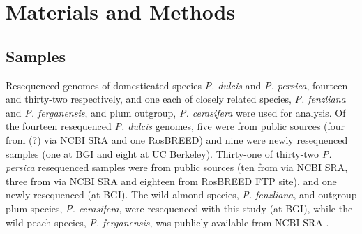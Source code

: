 \documentclass[12pt]{article}
\begin{document}
\section*{Materials and Methods}
%
\subsection*{Samples}
Resequenced genomes of domesticated species \emph{P. dulcis} and \emph{P. persica}, fourteen and thirty-two respectively, and one each of closely related species, \emph{P. fenzliana} and \emph{P. ferganensis}, and plum outgroup, \emph{P. cerasifera} were used for analysis.
%
Of the fourteen resequenced \emph{P. dulcis} genomes, five were from public sources (four from \citealt{koepke2013comparative}(?) via NCBI SRA and one RosBREED) and nine were newly resequenced samples (one at BGI and eight at UC Berkeley).
%
Thirty-one of thirty-two \emph{P. persica} resequenced samples were from public sources (ten from \citealt{verde2013high} via NCBI SRA, three from \citealt{ahmad2011whole} via NCBI SRA and eighteen from RosBREED FTP site),
and one newly resequenced (at BGI).
%
The wild almond species, \emph{P. fenzliana}, and outgroup plum species, \emph{P. cerasifera}, were resequenced with this study (at BGI), while the wild peach species, \emph{P. ferganensis}, was publicly available from NCBI SRA \citep{verde2013high}.\\
%
%
\end{document}
